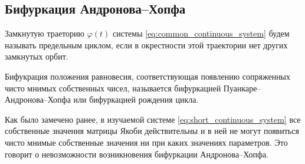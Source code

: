 \subsection{Бифуркация Андронова--Хопфа}
\begin{definition}
        Замкнутую траеторию $\varphi(t)$ системы \ref{eq:common_continuous_system} будем называть предельным циклом, если в окрестности этой траектории нет других замкнутых орбит.
        \cite[стр.~182]{bratus10}
\end{definition}
\begin{definition}
        Бифукрация положения равновесия, соответствующая появлению сопряженных чисто мнимых собственных чисел, называется бифуркацией Пуанкаре--Андронова--Хопфа или бифуркацией рождения цикла.
        \cite[стр.~192]{bratus10}
\end{definition}

Как было замечено ранее, в изучаемой системе \ref{eq:short_continuous_system} все собственные значения матрицы Якоби действительны и в ней не могут появиться чисто мнимые собственные значения ни при каких значениях параметров. Это говорит о невозможности возникновения бифуркации Андронова--Хопфа.
